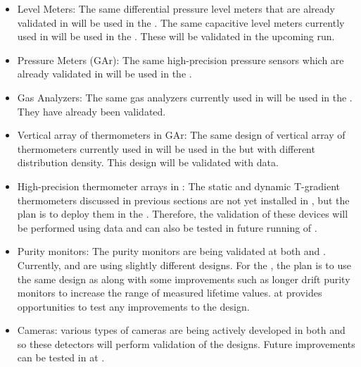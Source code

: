 \begin{itemize}
    \item  Level Meters: The same differential pressure level meters that are already validated in  will be used in the . The same capacitive level meters currently used in  will be used in the . These will be validated in the upcoming  run. 
    
    \item Pressure Meters (GAr): The same high-precision pressure sensors which are already validated in  will be used in the .
    
    \item Gas Analyzers:  The same gas analyzers currently used in  will be used in the . They have already been validated.
    
    \item Vertical array of thermometers in GAr: The same design of vertical array of thermometers currently used in  will be used in the  but with different distribution density. This design will be validated with  data.
    
    \item High-precision thermometer arrays in \lar: The static and dynamic T-gradient thermometers discussed in previous sections are not yet installed in , but the plan is to deploy them in the . Therefore, the validation of these devices will be performed using  data and can also be tested in future running of .
    
    \item Purity monitors: The purity monitors are being validated at both  and . Currently,  and  are using slightly different designs. For the , the plan is to use the same design as  along with some improvements such as longer drift purity monitors to increase the range of measured lifetime values.   at  provides opportunities to
	      test any improvements to the design. 
  \item Cameras: various types of cameras are being actively developed in both  and  so these detectors will perform validation of the   designs. Future improvements can be tested in  at . %
\end{itemize}

